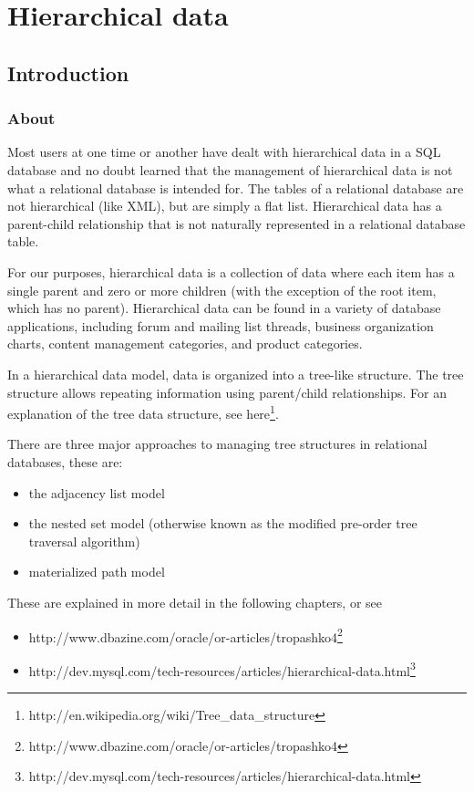 \documentclass[11pt,a4paper]{report}
\begin{document}
\section{Hierarchical data}
\subsection{Introduction}
\subsubsection{About}
Most users at one time or another have dealt with hierarchical data in a SQL database and no doubt learned that the management of hierarchical data is not what a relational database is intended for. The tables of a relational database are not hierarchical (like XML), but are simply a flat list. Hierarchical data has a parent-child relationship that is not naturally represented in a relational database table.

For our purposes, hierarchical data is a collection of data where each item has a single parent and zero or more children (with the exception of the root item, which has no parent). Hierarchical data can be found in a variety of database applications, including forum and mailing list threads, business organization charts, content management categories, and product categories.

In a hierarchical data model, data is organized into a tree-like structure. The tree structure allows repeating information using parent/child relationships. For an explanation of the tree data structure, see here\footnote{http://en.wikipedia.org/wiki/Tree\_data\_structure}.

There are three major approaches to managing tree structures in relational databases, these are:

\begin{itemize}
\item{the adjacency list model}
\item{the nested set model (otherwise known as the modified pre-order tree traversal algorithm)}
\item{materialized path model}
\end{itemize}
These are explained in more detail in the following chapters, or see

\begin{itemize}
\item{http://www.dbazine.com/oracle/or-articles/tropashko4\footnote{http://www.dbazine.com/oracle/or-articles/tropashko4}}
\item{http://dev.mysql.com/tech-resources/articles/hierarchical-data.html\footnote{http://dev.mysql.com/tech-resources/articles/hierarchical-data.html}}
\end{itemize}
\end{document}
